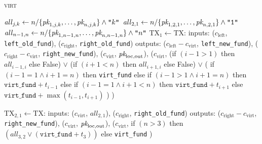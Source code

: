 \begin{processbox}{\textsc{virt}}
\begin{algorithmic}[1]
        \State $\mathit{all}_{j, k} \gets n/\{\textit{pk}_{1, j, k}, \dots,
        \textit{pk}_{n, j, k}\} \wedge \texttt{"}k\texttt{"}$
      \EndFor
        \State $\mathit{all}_{2, 1} \gets n/\{\textit{pk}_{1, 2, 1}, \dots, \textit{pk}_{n, 2,
        1}\} \wedge \texttt{"1"}$
      \EndIf
        \State $\mathit{all}_{n-1, n} \gets n/\{\textit{pk}_{1, n-1, n}, \dots, \textit{pk}_{n,
        n-1, n}\} \wedge \texttt{"}n\texttt{"}$
      \EndIf
      \State {}
      \State {}
      \State $\mathrm{TX}_1 \gets \mathrm{TX}$:
      \Indent
        \State inputs:
        \Indent
          \State ($c_{\mathrm{left}}$, \texttt{left\_old\_fund}),
          \State ($c_{\mathrm{right}}$, \texttt{right\_old\_fund})
        \EndIndent
        \State outputs:
        \Indent
          \State ($c_{\mathrm{left}} - c_{\mathrm{virt}}$,
          \texttt{left\_new\_fund}),
          \State ($c_{\mathrm{right}} - c_{\mathrm{virt}}$,
          \texttt{right\_new\_fund}),
          \State ($c_{\mathrm{virt}}$, $\textit{pk}_{\mathrm{loc}, \mathrm{out}}$),
          \State ($c_{\mathrm{virt}}$,
          \Indent
            \State (if $(i-1 > 1)$ then $\mathit{all}_{i-1, i}$ else False)
            \State $\vee$ (if $(i+1 < n)$ then $\mathit{all}_{i+1, i}$ else
            False)
            \State $\vee$ (
            \Indent
              \State if $(i-1 = 1 \wedge i+1 = n)$ then \texttt{virt\_fund}
              \State else if $(i-1 > 1 \wedge i+1 = n)$ then
              $\texttt{virt\_fund} + t_{i-1}$
              \State else if $(i-1 = 1 \wedge i+1 < n)$ then
              $\texttt{virt\_fund} + t_{i+1}$
              \State else 
              $\texttt{virt\_fund} + \max{(t_{i-1}, t_{i+1})}$
            \EndIndent
            \State )
          \EndIndent
          \State )
        \EndIndent
      \EndIndent

        \State $\mathrm{TX}_{2, 1} \gets \mathrm{TX}$:
        \Indent
          \State inputs:
          \Indent
            \State ($c_{\mathrm{virt}}$, $\mathit{all}_{2, 1}$),
            \State ($c_{\mathrm{right}}$, \texttt{right\_old\_fund})
          \EndIndent
          \State outputs:
          \Indent
            \State ($c_{\mathrm{right}} - c_{\mathrm{virt}}$,
            \texttt{right\_new\_fund}),
            \State ($c_{\mathrm{virt}}$, $\textit{pk}_{\mathrm{loc}, \mathrm{out}}$),
            \State ($c_{\mathrm{virt}}$,
            \Indent
              \State if $(n > 3)$ then $(\mathit{all}_{3, 2}
              \vee (\texttt{virt\_fund} + t_3))$
              \State else \texttt{virt\_fund}
            \EndIndent
            \State )
          \EndIndent
        \EndIndent
      \EndIf


\end{algorithmic}
\end{processbox}
